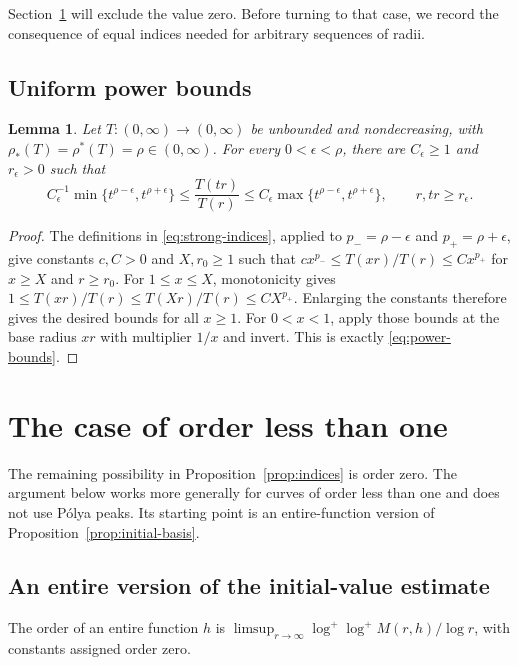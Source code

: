 \documentclass[11pt,letterpaper,reqno]{amsart}
\newtheorem{lem}[thm]{Lemma}
\theoremstyle{remark}
\numberwithin{equation}{section}
\begin{document}
Section~\ref{sec:smallorder} will exclude the value zero. Before turning to
that case, we record the consequence of equal indices needed for arbitrary
sequences of radii.

\subsection{Uniform power bounds}

\begin{lem}\label{lem:power-bounds}
Let $T\colon(0,\infty)\to(0,\infty)$ be unbounded and nondecreasing, with
$\rho_*(T)=\rho^*(T)=\rho\in(0,\infty)$. For every $0<\epsilon<\rho$,
there are $C_\epsilon\ge1$ and $r_\epsilon>0$ such that
\begin{equation}\label{eq:power-bounds}
 C_\epsilon^{-1}\min\{t^{\rho-\epsilon},t^{\rho+\epsilon}\}
 \le\frac{T(tr)}{T(r)}
 \le C_\epsilon\max\{t^{\rho-\epsilon},t^{\rho+\epsilon}\},
 \qquad r,tr\ge r_\epsilon.
\end{equation}
\end{lem}
\begin{proof}
The definitions in \eqref{eq:strong-indices}, applied to
$p_-=\rho-\epsilon$ and $p_+=\rho+\epsilon$, give constants $c,C>0$ and
$X,r_0\ge1$ such that
$c x^{p_-}\le T(xr)/T(r)\le Cx^{p_+}$ for $x\ge X$ and $r\ge r_0$.
For $1\le x\le X$, monotonicity gives
$1\le T(xr)/T(r)\le T(Xr)/T(r)\le CX^{p_+}$.
Enlarging the constants therefore gives the desired bounds for all $x\ge1$.
For $0<x<1$, apply those bounds at the base radius $xr$ with multiplier
$1/x$ and invert. This is exactly \eqref{eq:power-bounds}.
\end{proof}

\section{The case of order less than one}\label{sec:smallorder}

The remaining possibility in Proposition~\ref{prop:indices} is order zero.
The argument below works more generally for curves of order less than one
and does not use P\'olya peaks. Its starting point is an entire-function
version of Proposition~\ref{prop:initial-basis}.

\subsection{An entire version of the initial-value estimate}

The order of an entire function $h$ is
$\limsup_{r\to\infty}\log^+\log^+M(r,h)/\log r$, with constants assigned
order zero.
\end{document}
